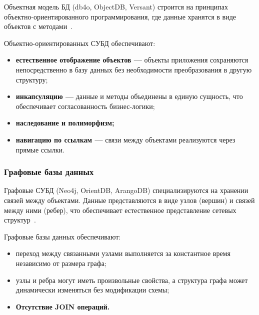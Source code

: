 \noindent
\hspace{1.25cm}
Объектная модель БД (db4o, ObjectDB, Versant) строится на принципах объектно-ориентированного программирования, где данные хранятся в виде объектов с методами~\cite{eldar}.

\noindent
\hspace{1.25cm}
Объектно-ориентированных СУБД обеспечивают:

\begin{itemize}
    \item \textbf{естественное отображение объектов ---} объекты приложения сохраняются непосредственно в базу данных без необходимости преобразования в другую структуру;
    
    \item \textbf{инкапсуляцию ---} данные и методы объединены в единую сущность, что обеспечивает согласованность бизнес-логики;
    
    \item \textbf{наследование и полиморфизм;}
    
    \item \textbf{навигацию по ссылкам ---} связи между объектами реализуются через прямые ссылки.    
\end{itemize}
    

\subsubsection{Графовые базы данных}

\noindent
\hspace{1.25cm}
Графовые СУБД (Neo4j, OrientDB, ArangoDB) специализируются на хранении связей между объектами. Данные представляются в виде узлов (вершин) и связей между ними (ребер), что обеспечивает естественное представление сетевых структур~\cite{otradnov}.

\noindent
\hspace{1.25cm}
Графовые базы данных обеспечивают:

\begin{itemize}
    \item переход между связанными узлами выполняется за константное время независимо от размера графа;
    
    \item узлы и ребра могут иметь произвольные свойства, а структура графа может динамически изменяться без модификации схемы;
    
    \item \textbf{Отсутствие JOIN операций.}
\end{itemize}

